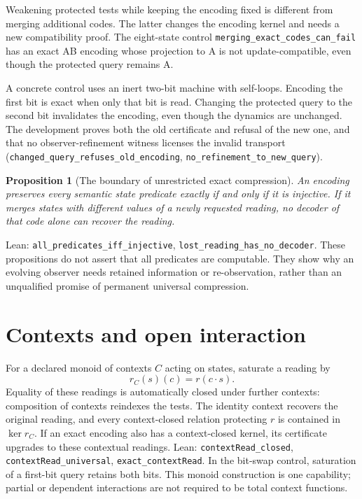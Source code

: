 \documentclass[11pt]{article}
\newtheorem{proposition}{Proposition}
\newcommand{\lean}[1]{\nolinkurl{#1}}
\begin{document}
Weakening protected tests while keeping the encoding fixed is different from
merging additional codes. The latter changes the encoding kernel and needs
a new compatibility proof. The eight-state control
\lean{merging_exact_codes_can_fail} has an exact AB encoding whose projection
to A is not update-compatible, even though the protected query remains A.

A concrete control uses an inert two-bit machine with self-loops. Encoding
the first bit is exact when only that bit is read. Changing the protected
query to the second bit invalidates the encoding, even though the dynamics
are unchanged. The development proves both the old certificate and refusal
of the new one, and that no observer-refinement witness licenses the invalid
transport (\lean{changed_query_refuses_old_encoding},
\lean{no_refinement_to_new_query}).

\begin{proposition}[The boundary of unrestricted exact compression]
An encoding preserves every semantic state predicate exactly if and only if
it is injective. If it merges states with different values of a newly
requested reading, no decoder of that code alone can recover the reading.
\end{proposition}
\noindent Lean: \lean{all_predicates_iff_injective},
\lean{lost_reading_has_no_decoder}. These propositions do not assert that all
predicates are computable. They show why an evolving observer needs retained
information or re-observation, rather than an unqualified promise of
permanent universal compression.

\section{Contexts and open interaction}
For a declared monoid of contexts $C$ acting on states, saturate a reading by
\[
  r_C(s)(c)=r(c\cdot s).
\]
Equality of these readings is automatically closed under further contexts:
composition of contexts reindexes the tests. The identity context recovers
the original reading, and every context-closed relation protecting $r$ is
contained in $\ker r_C$. If an exact encoding also has a context-closed kernel,
its certificate upgrades to these contextual readings.
Lean: \lean{contextRead_closed}, \lean{contextRead_universal},
\lean{exact_contextRead}. In the bit-swap control, saturation of a first-bit
query retains both bits. This monoid construction is one capability; partial
or dependent interactions are not required to be total context functions.
\end{document}
